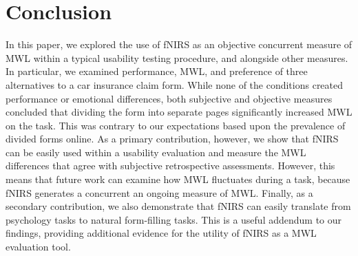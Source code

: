\documentclass[../main/Replicate.tex]{subfiles}
\begin{document}
	\section{Conclusion}
	In this paper, we explored the use of fNIRS as an objective concurrent measure of MWL within a typical usability testing procedure, and alongside other measures. In particular, we examined performance, MWL, and preference of three alternatives to a car insurance claim form. %
	While none of the conditions created performance or emotional differences, both subjective and objective measures concluded that dividing the form into separate pages significantly increased MWL on the task. This was contrary to our expectations based upon the prevalence of divided forms online. As a primary contribution, however, we show that fNIRS can be easily used within a usability evaluation and measure the MWL differences that agree with subjective retrospective assessments. However, this means that future work can examine how MWL fluctuates during a task, because fNIRS generates a concurrent an ongoing measure of MWL. Finally, as a secondary contribution, we also demonstrate that fNIRS can easily translate from psychology tasks to natural form-filling tasks. This is a useful addendum to our findings, providing additional evidence for the utility of fNIRS as a MWL evaluation tool.
\\
\end{document}
